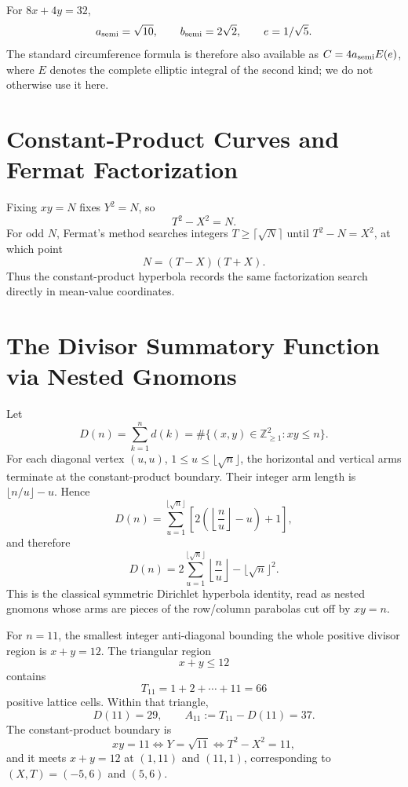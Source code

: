 \documentclass[11pt]{amsart}
\theoremstyle{remark}
\begin{document}
For $8x+4y=32$,
\[
a_{\rm semi}=\sqrt{10},\qquad b_{\rm semi}=2\sqrt2,\qquad e=1/\sqrt5.
\]
The standard circumference formula is therefore also available as $C=4a_{\rm semi}E(e)$, where $E$ denotes the complete elliptic integral of the second kind; we do not otherwise use it here.

\section{Constant-Product Curves and Fermat Factorization}
Fixing $xy=N$ fixes $Y^2=N$, so
\begin{equation}
T^2-X^2=N. \tag{4.1}
\end{equation}
For odd $N$, Fermat's method searches integers $T\ge\lceil\sqrt N\rceil$ until $T^2-N=X^2$, at which point
\[
N=(T-X)(T+X).
\]
Thus the constant-product hyperbola records the same factorization search directly in mean-value coordinates.

\section{The Divisor Summatory Function via Nested Gnomons}
Let
\[
D(n)=\sum_{k=1}^n d(k)=\#\{(x,y)\in\mathbb Z_{\ge1}^2:xy\le n\}.
\]
For each diagonal vertex $(u,u)$, $1\le u\le\lfloor\sqrt n\rfloor$, the horizontal and vertical arms terminate at the constant-product boundary. Their integer arm length is $\lfloor n/u\rfloor-u$. Hence
\begin{equation}
D(n)=\sum_{u=1}^{\lfloor\sqrt n\rfloor}\left[2\left(\left\lfloor\frac nu\right\rfloor-u\right)+1\right], \tag{5.1}
\end{equation}
and therefore
\begin{equation}
D(n)=2\sum_{u=1}^{\lfloor\sqrt n\rfloor}\left\lfloor\frac nu\right\rfloor-\lfloor\sqrt n\rfloor^2. \tag{5.2}
\end{equation}
This is the classical symmetric Dirichlet hyperbola identity, read as nested gnomons whose arms are pieces of the row/column parabolas cut off by $xy=n$.

For $n=11$, the smallest integer anti-diagonal bounding the whole positive divisor region is $x+y=12$. The triangular region
\[
x+y\le12
\]
contains
\[
T_{11}=1+2+\cdots+11=66
\]
positive lattice cells. Within that triangle,
\[
D(11)=29,\qquad A_{11}:=T_{11}-D(11)=37.
\]
The constant-product boundary is
\[
xy=11\iff Y=\sqrt{11}\iff T^2-X^2=11,
\]
and it meets $x+y=12$ at $(1,11)$ and $(11,1)$, corresponding to $(X,T)=(-5,6)$ and $(5,6)$.
\end{document}
